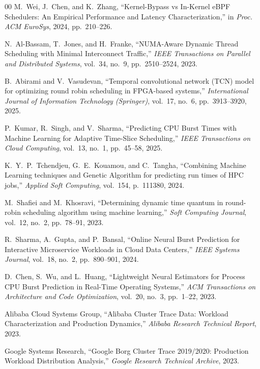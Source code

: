 \documentclass[journal]{IEEEtran}
\begin{document}
\begin{thebibliography}{00}
M.~Wei, J.~Chen, and K.~Zhang, ``Kernel-Bypass vs In-Kernel eBPF Schedulers: An Empirical Performance and Latency Characterization,'' in \emph{Proc. ACM EuroSys}, 2024, pp.~210--226.

N.~Al-Bassam, T.~Jones, and H.~Franke, ``NUMA-Aware Dynamic Thread Scheduling with Minimal Interconnect Traffic,'' \emph{IEEE Transactions on Parallel and Distributed Systems}, vol.~34, no.~9, pp.~2510--2524, 2023.

B.~Abirami and V.~Vasudevan, ``Temporal convolutional network (TCN) model for optimizing round robin scheduling in FPGA-based systems,'' \emph{International Journal of Information Technology (Springer)}, vol.~17, no.~6, pp.~3913--3920, 2025.

P.~Kumar, R.~Singh, and V.~Sharma, ``Predicting CPU Burst Times with Machine Learning for Adaptive Time-Slice Scheduling,'' \emph{IEEE Transactions on Cloud Computing}, vol.~13, no.~1, pp.~45--58, 2025.

K.~Y.~P.~Tchendjeu, G.~E.~Kouamou, and C.~Tangha, ``Combining Machine Learning techniques and Genetic Algorithm for predicting run times of HPC jobs,'' \emph{Applied Soft Computing}, vol.~154, p.~111380, 2024.

M.~Shafiei and M.~Khosravi, ``Determining dynamic time quantum in round-robin scheduling algorithm using machine learning,'' \emph{Soft Computing Journal}, vol.~12, no.~2, pp.~78--91, 2023.

R.~Sharma, A.~Gupta, and P.~Bansal, ``Online Neural Burst Prediction for Interactive Microservice Workloads in Cloud Data Centers,'' \emph{IEEE Systems Journal}, vol.~18, no.~2, pp.~890--901, 2024.

D.~Chen, S.~Wu, and L.~Huang, ``Lightweight Neural Estimators for Process CPU Burst Prediction in Real-Time Operating Systems,'' \emph{ACM Transactions on Architecture and Code Optimization}, vol.~20, no.~3, pp.~1--22, 2023.

Alibaba Cloud Systems Group, ``Alibaba Cluster Trace Data: Workload Characterization and Production Dynamics,'' \emph{Alibaba Research Technical Report}, 2023.

Google Systems Research, ``Google Borg Cluster Trace 2019/2020: Production Workload Distribution Analysis,'' \emph{Google Research Technical Archive}, 2023.


\end{thebibliography}
\end{document}
